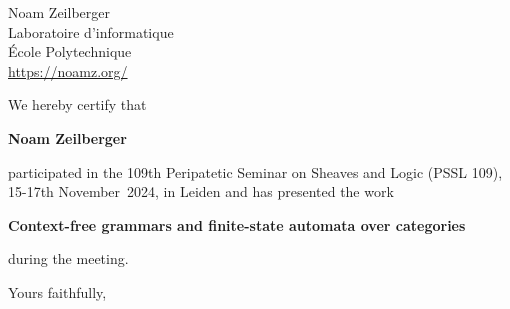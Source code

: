 \documentclass[
  fontsize=11pt,
  paper=a4,
  parskip=half,
  enlargefirstpage=on,    %
  fromalign=right,        %
  fromlogo=on,
  fromrule=off,     %
  addrfield=on,           %
  backaddress=off,         %
  subject=beforeopening,  %
  locfield=off,        %
  foldmarks=off,           %
  pagenumber=off
]{scrlttr2}
\begin{document}
\begin{letter}{%
    Noam Zeilberger \\
    Laboratoire d'informatique \\
    École Polytechnique \\
    \url{https://noamz.org/}
  }
  \opening{}

  We hereby certify that
  \begin{center}
    \textbf{Noam Zeilberger}
  \end{center}
  participated in the 109th Peripatetic Seminar on Sheaves and Logic
  (PSSL 109), 15-17th November~2024, in Leiden and has 
  presented the work
  \begin{center}
    \textbf{Context-free grammars and finite-state automata over categories}
  \end{center}
  during the meeting.

\vfill
\closing{Yours faithfully,}
\end{letter}
\end{document}
